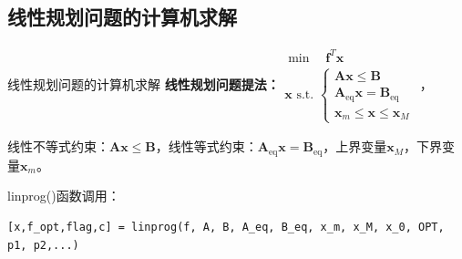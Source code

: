 \documentclass[12pt]{beamer}
\begin{document}
	\subsection{线性规划问题的计算机求解}
\begin{frame}[fragile]{线性规划问题的计算机求解}
	\textbf{线性规划问题提法：}$
	\begin{array}{l}
	\min \quad \mathbf{f}^T \mathbf{x}\\
	\mathbf{x} \text { s.t. }\left\{\begin{array}{l}
	\mathbf{A} \mathbf{x} \leqslant \mathbf{B} \\
	\mathbf{A}_{\mathrm{eq}} \mathbf{x}=\mathbf{B}_{\mathrm{eq}} \\
	\mathbf{x}_{m} \leqslant \mathbf{x} \leqslant \mathbf{x}_{M}
	\end{array}\right.
	\end{array}$，
	
	线性不等式约束：$\mathbf{A} \mathbf{x} \leqslant \mathbf{B}$，线性等式约束：$\mathbf{A}_{\mathrm{eq}} \mathbf{x}=\mathbf{B}_{\mathrm{eq}}$，上界变量$\mathbf{x}_{M}$，下界变量$\mathbf{x}_{m}$。
	
	\begin{block}{linprog()函数调用：}
\begin{lstlisting}
[x,f_opt,flag,c] = linprog(f, A, B, A_eq, B_eq, x_m, x_M, x_0, OPT, p1, p2,...)
\end{lstlisting}
	\end{block}	
	
\end{frame}
\end{document}
